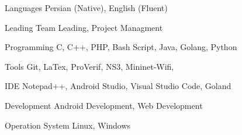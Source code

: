 

\begin{cvskills}

    \cvskill
    {Languages}
    {Persian (Native), English (Fluent)}

    \cvskill
    {Leading}
    {Team Leading, Project Managment}


    \cvskill
    {Programming}
    {C, C++, PHP, Bash Script, Java, Golang, Python}

    \cvskill
    {}
    {}

    \cvskill
    {Tools}
    {Git, LaTex, ProVerif, NS3, Mininet-Wifi, }

    \cvskill
    {IDE}
    {Notepad++, Android Studio, Visual Studio Code, Goland}
     
    \cvskill
    {Development}
    {Android Development, Web Development}
     
    \cvskill
    {Operation System}
    {Linux, Windows}

\end{cvskills}
